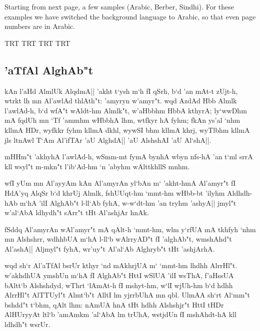 \documentclass[a4paper,11pt]{article}
\begin{document}

Starting from next page, a few samples (Arabic, Berber, Sindhi). For
these examples we have switched the background language to Arabic, so
that even page numbers are in Arabic.

\newpage
\pagedir TRT
\bodydir TRT
\pardir TRT
\textdir TRT
\def\latinit#1{{\fontfamily{omlgc}\selectfont\pushocplist\BasicLatinOCP%
\textdir TLT #1\popocplist}}
\def\rmdefault{omarb}
\selectfont
\pushocplist\ArabicOCP


\subsection{'aTfAl AlghAb"t}

kAn l'aHd AlmlUk AlqdmA|| 'akht t`ysh m`h fI qSrh, b`d 'an mAt-t
zUjt-h, wtrkt lh mn Al'awlAd thlAth"t: 'amyryn w'amyr"t. wqd AzdAd Hbb
Almlk l'awlAd-h, b`d wfA"t wAldt-hm Almlk"t, w'aHbbhm HbbA kthyrA;
ly`wwDhm mA fqdUh mn `Tf 'ammhm wHbbhA lhm, wtfkyr hA fyhm; fkAn ys'al
`nhm kllmA HDr, wyfkkr fyhm kllmA dkhl, wywSI bhm kllmA khrj, wyTlbhm
kllmA jls ltnAwl T`Am Al'ifTAr 'aU AlghdA|| 'aU AlshshAI 'aU Al`shA||.

mHHm"t 'akhyhA l'awlAd-h, wSmm-mt fymA bynhA wbyn nfs-hA 'an t`ml srrA
kll wsyl"t m-mkn"t l'ib`Ad-hm `n 'abyhm wAlttkhllS mnhm.

wfI yUm mn Al'ayyAm kAn Al'amyrAn yl`bAn m` 'akht-hmA Al'amyr"t fI
HdA'yq AlqSr b`d khrUj Almlk, fshUUqt-hm `mmt-hm wHbb-bt 'ilyhm
Aldhdh-hAb m`hA 'ilI AlghAb"t l-ll`Ab fyhA, w-w`dt-hm 'an tryhm
'ashyA|| jmyl"t w'al`AbA ldhydh"t sArr"t tHt Al'ashjAr hnAk.

fSddq Al'amyrAn wAl'amyr"t mA qAlt-h `mmt-hm, wlm y`rfUA mA tkhfyh
`nhm mn Alshshrr, wdhhbUA m`hA l-ll`b wAlrryAD"t fI 'alghAb"t,
wmshAhd"t Al'ashA|| Aljmyl"t fyhA, wr'uy"t Al'al`Ab Alghryb"t tHt
'ashjArhA.

wqd sh`r Al'aTfAl bsrUr kthyr `nd mAkhrjUA m` `mmt-hm lhdhh
AlrrHl"t. w'akhdhUA ymshUn m`hA fI AlghAb"t HttI wSlUA 'ilI wsThA,
f'aHssUA bAltt`b Alshshdyd, wThrt `lAmAt-h fI mshyt-hm, w`lI wjUh-hm
b`d hdhh AlrrHl"t AlTTUyl"t Almt`b"t AlltI lm yjrrbUhA mn qbl.  UlmAA
sh`rt Al`mm"t bshdd"t t`bhm, qAlt lhm: nAmUA hnA tHt hdhh Alshshjr"t
HttI tHDr AlHUryyAt ltl`b 'amAmkm 'al`AbA lm trUhA, wstjdUn fI
mshAhdt-hA kll ldhdh"t wsrUr.  \popocplist

\pushocplist\ArabicBerberOCP
\end{document}
